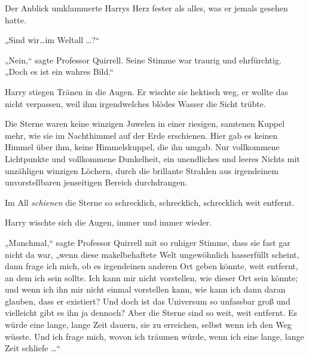 Der Anblick umklammerte Harrys Herz fester als alles, was er jemals gesehen hatte.

„Sind wir…im Weltall …?“

„Nein,“ sagte Professor Quirrell. Seine Stimme war traurig und ehrfürchtig. „Doch es ist ein wahres Bild.“

Harry stiegen Tränen in die Augen. Er wischte sie hektisch weg, er wollte das nicht verpassen, weil ihm irgendwelches blödes Wasser die Sicht trübte.

Die Sterne waren keine winzigen Juwelen in einer riesigen, samtenen Kuppel mehr, wie sie im Nachthimmel auf der Erde erschienen. Hier gab es keinen Himmel über ihm, keine Himmelskuppel, die ihn umgab. Nur vollkommene Lichtpunkte und vollkommene Dunkelheit, ein unendliches und leeres Nichts mit unzähligen winzigen Löchern, durch die brillante Strahlen aus irgendeinem unvorstellbaren jenseitigen Bereich durchdrangen.

Im All \emph{schienen} die Sterne so schrecklich, schrecklich, schrecklich weit entfernt.

Harry wischte sich die Augen, immer und immer wieder.

„Manchmal,“ sagte Professor Quirrell mit so ruhiger Stimme, dass sie fast gar nicht da war, „wenn diese makelbehaftete Welt ungewöhnlich hasserfüllt scheint, dann frage ich mich, ob es irgendeinen anderen Ort geben könnte, weit entfernt, an dem ich sein sollte. Ich kann mir nicht vorstellen, wie dieser Ort sein könnte; und wenn ich ihn mir nicht einmal vorstellen kann, wie kann ich dann daran glauben, dass er existiert? Und doch ist das Universum so unfassbar groß und vielleicht gibt es ihn ja dennoch? Aber die Sterne sind so weit, weit entfernt. Es würde eine lange, lange Zeit dauern, sie zu erreichen, selbst wenn ich den Weg wüsste. Und ich frage mich, wovon ich träumen würde, wenn ich eine lange, lange Zeit schliefe …“

